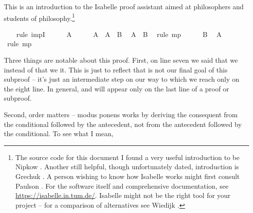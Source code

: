 \begin{isabellebody}
\begin{isamarkuptext}%
This is an introduction to the Isabelle proof assistant aimed at philosophers and students
of philosophy.\footnote{The source code for this document  I found a very useful introduction to be Nipkow \cite{nipkow_tutorial_2011}.
Another still helpful, though unfortunately dated, introduction is Grechuk \cite{grechuk_isabelle_2010}.
A person wishing to know how Isabelle works might first consult Paulson \cite{paulson_ml_1996}.
For the software itself and comprehensive documentation, see \url{https://isabelle.in.tum.de/}.
Isabelle might not be the right tool for your project -- for a comparison of alternatives see
Wiedijk \cite{wiedijk_seventeen_2006}.}%
\end{isamarkuptext}\isamarkuptrue%
\ \ \isamarkupfalse%
\ {\isacharparenleft}rule\ impI{\isacharparenright}\isanewline
\ \ \ \ \isamarkupfalse%
\ {\isachardoublequoteopen}A{\isachardoublequoteclose}\isanewline
\ \ \ \ \isamarkupfalse%
\ {\isacharbackquoteopen}A\ {\isasymlongrightarrow}\ A\ {\isasymlongrightarrow}\ B{\isacharbackquoteclose}\ \isamarkupfalse%
\ {\isachardoublequoteopen}A\ {\isasymlongrightarrow}\ B{\isachardoublequoteclose}\ \isamarkupfalse%
\ {\isacharparenleft}rule\ mp{\isacharparenright}\isanewline
\ \ \ \ \isamarkupfalse%
\ {\isachardoublequoteopen}B{\isachardoublequoteclose}\ \isamarkupfalse%
\ {\isacharbackquoteopen}A{\isacharbackquoteclose}\ \isamarkupfalse%
\ {\isacharparenleft}rule\ mp{\isacharparenright}\isanewline
\ \ \isamarkupfalse%
\isanewline
{}\isamarkupfalse%
%
\endisatagproof
{\isafoldproof}%
%
\isadelimproof
%
\endisadelimproof
%
\begin{isamarkuptext}%
Three things are notable about this proof. First, on line seven we said that we 
  instead of that we  it. This is just to reflect that 
is not our final goal of this subproof -- it's just an intermediate step on our way to 
which we reach only on the eight line. In general,  and  will appear only
on the last line of a proof or subproof.%
\end{isamarkuptext}\isamarkuptrue%
%
\begin{isamarkuptext}%
Second, order matters -- modus ponens works by deriving the consequent from the conditional 
followed by the antecedent, not from the antecedent followed by the conditional. To see what I mean,

\end{isamarkuptext}
\end{isabellebody}
